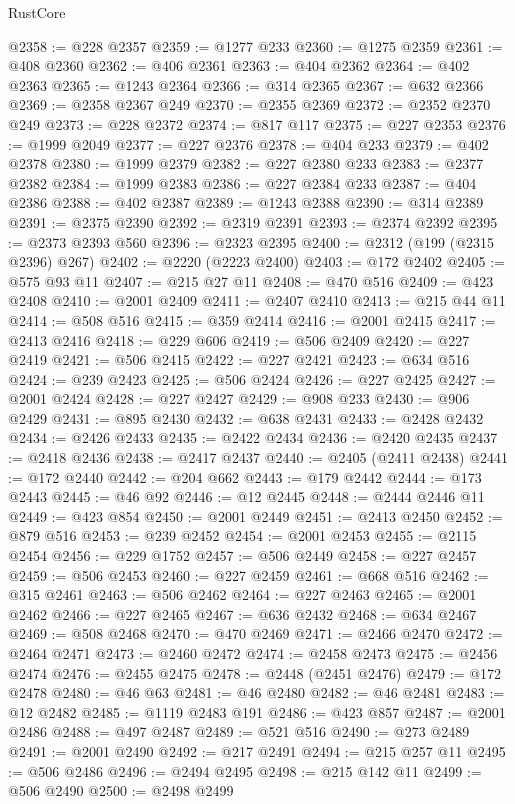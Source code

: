 \begin{lexlean}{RustCore}
\begin{coremodule}
@2358 := @228 @2357
@2359 := @1277 @233
@2360 := @1275 @2359
@2361 := @408 @2360
@2362 := @406 @2361
@2363 := @404 @2362
@2364 := @402 @2363
@2365 := @1243 @2364
@2366 := @314 @2365
@2367 := @632 @2366
@2369 := @2358 @2367 @249
@2370 := @2355 @2369
@2372 := @2352 @2370 @249
@2373 := @228 @2372
@2374 := @817 @117
@2375 := @227 @2353
@2376 := @1999 @2049
@2377 := @227 @2376
@2378 := @404 @233
@2379 := @402 @2378
@2380 := @1999 @2379
@2382 := @227 @2380 @233
@2383 := @2377 @2382
@2384 := @1999 @2383
@2386 := @227 @2384 @233
@2387 := @404 @2386
@2388 := @402 @2387
@2389 := @1243 @2388
@2390 := @314 @2389
@2391 := @2375 @2390
@2392 := @2319 @2391
@2393 := @2374 @2392
@2395 := @2373 @2393 @560
@2396 := @2323 @2395
@2400 := @2312 (@199 (@2315 @2396) @267)
@2402 := @2220 (@2223 @2400)
@2403 := @172 @2402
@2405 := @575 @93 @11
@2407 := @215 @27 @11
@2408 := @470 @516
@2409 := @423 @2408
@2410 := @2001 @2409
@2411 := @2407 @2410
@2413 := @215 @44 @11
@2414 := @508 @516
@2415 := @359 @2414
@2416 := @2001 @2415
@2417 := @2413 @2416
@2418 := @229 @606
@2419 := @506 @2409
@2420 := @227 @2419
@2421 := @506 @2415
@2422 := @227 @2421
@2423 := @634 @516
@2424 := @239 @2423
@2425 := @506 @2424
@2426 := @227 @2425
@2427 := @2001 @2424
@2428 := @227 @2427
@2429 := @908 @233
@2430 := @906 @2429
@2431 := @895 @2430
@2432 := @638 @2431
@2433 := @2428 @2432
@2434 := @2426 @2433
@2435 := @2422 @2434
@2436 := @2420 @2435
@2437 := @2418 @2436
@2438 := @2417 @2437
@2440 := @2405 (@2411 @2438)
@2441 := @172 @2440
@2442 := @204 @662
@2443 := @179 @2442
@2444 := @173 @2443
@2445 := @46 @92
@2446 := @12 @2445
@2448 := @2444 @2446 @11
@2449 := @423 @854
@2450 := @2001 @2449
@2451 := @2413 @2450
@2452 := @879 @516
@2453 := @239 @2452
@2454 := @2001 @2453
@2455 := @2115 @2454
@2456 := @229 @1752
@2457 := @506 @2449
@2458 := @227 @2457
@2459 := @506 @2453
@2460 := @227 @2459
@2461 := @668 @516
@2462 := @315 @2461
@2463 := @506 @2462
@2464 := @227 @2463
@2465 := @2001 @2462
@2466 := @227 @2465
@2467 := @636 @2432
@2468 := @634 @2467
@2469 := @508 @2468
@2470 := @470 @2469
@2471 := @2466 @2470
@2472 := @2464 @2471
@2473 := @2460 @2472
@2474 := @2458 @2473
@2475 := @2456 @2474
@2476 := @2455 @2475
@2478 := @2448 (@2451 @2476)
@2479 := @172 @2478
@2480 := @46 @63
@2481 := @46 @2480
@2482 := @46 @2481
@2483 := @12 @2482
@2485 := @1119 @2483 @191
@2486 := @423 @857
@2487 := @2001 @2486
@2488 := @497 @2487
@2489 := @521 @516
@2490 := @273 @2489
@2491 := @2001 @2490
@2492 := @217 @2491
@2494 := @215 @257 @11
@2495 := @506 @2486
@2496 := @2494 @2495
@2498 := @215 @142 @11
@2499 := @506 @2490
@2500 := @2498 @2499

\end{coremodule}
\end{lexlean}
